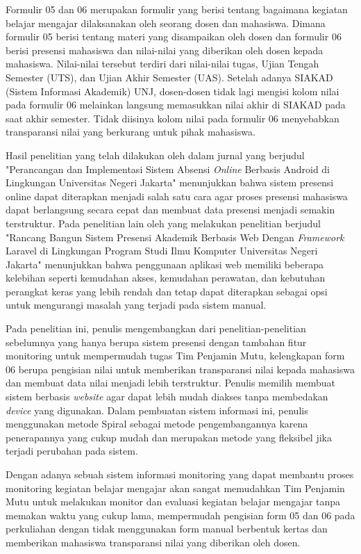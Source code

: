 	Formulir 05 dan 06 merupakan formulir yang berisi tentang bagaimana kegiatan belajar mengajar dilaksanakan oleh seorang dosen dan mahasiswa. Dimana formulir 05 berisi tentang materi yang disampaikan oleh dosen dan formulir 06 berisi presensi mahasiswa dan nilai-nilai yang diberikan oleh dosen kepada mahasiswa. Nilai-nilai tersebut terdiri dari nilai-nilai tugas, Ujian Tengah Semester (UTS), dan Ujian Akhir Semester (UAS). Setelah adanya SIAKAD (Sistem Informasi Akademik) UNJ, dosen-dosen tidak lagi mengisi kolom nilai pada formulir 06 melainkan langsung memasukkan nilai akhir di SIAKAD pada saat akhir semester. Tidak diisinya kolom nilai pada formulir 06 menyebabkan transparansi nilai yang berkurang untuk pihak mahasiswa.

	Hasil penelitian yang telah dilakukan oleh \cite{FitriAndiniMedIrzal2017} dalam jurnal yang berjudul "Perancangan dan Implementasi Sistem Absensi \textit{Online} Berbasis Android di Lingkungan Universitas Negeri Jakarta" menunjukkan bahwa sistem presensi online dapat diterapkan menjadi salah satu cara agar proses presensi mahasiswa dapat berlangsung secara cepat dan membuat data presensi menjadi semakin terstruktur. Pada penelitian lain oleh \cite{Kultsum2021} yang melakukan penelitian berjudul "Rancang Bangun Sistem Presensi Akademik Berbasis Web Dengan \textit{Framework} Laravel di Lingkungan Program Studi Ilmu Komputer Universitas Negeri Jakarta" menunjukkan bahwa penggunaan aplikasi web memiliki beberapa kelebihan seperti kemudahan akses, kemudahan perawatan, dan kebutuhan perangkat keras yang lebih rendah dan tetap dapat diterapkan sebagai opsi untuk mengurangi masalah yang terjadi pada sistem manual.

	Pada penelitian ini, penulis mengembangkan dari penelitian-penelitian sebelumnya yang hanya berupa sistem presensi dengan tambahan fitur monitoring untuk mempermudah tugas Tim Penjamin Mutu, kelengkapan form 06 berupa pengisian nilai untuk memberikan transparansi nilai kepada mahasiswa dan membuat data nilai menjadi lebih terstruktur. Penulis memilih membuat sistem berbasis \textit{website} agar dapat lebih mudah diakses tanpa membedakan \textit{device} yang digunakan. Dalam pembuatan sistem informasi ini, penulis menggunakan metode Spiral sebagai metode pengembangannya karena penerapannya yang cukup mudah dan merupakan metode yang fleksibel jika terjadi perubahan pada sistem.

	Dengan adanya sebuah sistem informasi monitoring yang dapat membantu proses monitoring kegiatan belajar mengajar akan sangat memudahkan Tim Penjamin Mutu untuk melakukan monitor dan evaluasi kegiatan belajar mengajar tanpa memakan waktu yang cukup lama, mempermudah pengisian form 05 dan 06 pada perkuliahan dengan tidak menggunakan form manual berbentuk kertas dan memberikan mahasiswa transparansi nilai yang diberikan oleh dosen.

